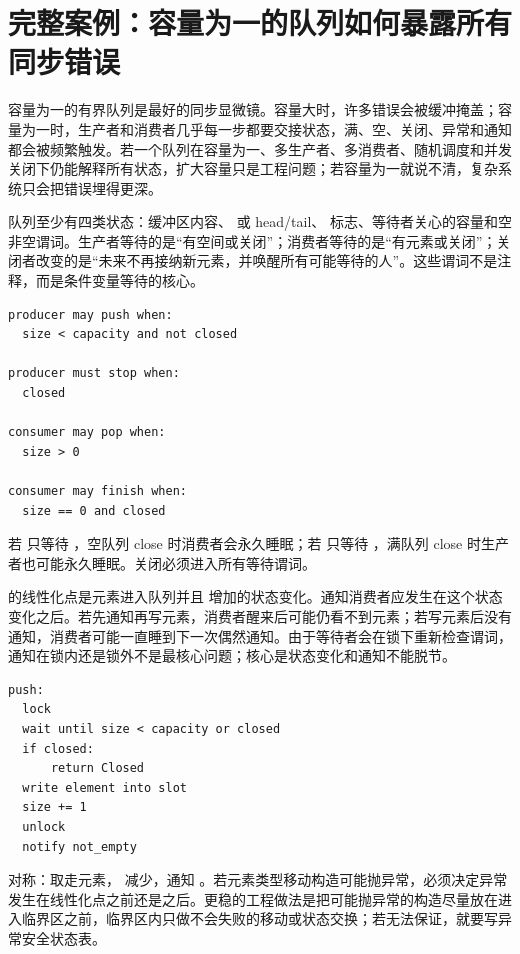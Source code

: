\section{完整案例：容量为一的队列如何暴露所有同步错误}

容量为一的有界队列是最好的同步显微镜。容量大时，许多错误会被缓冲掩盖；容量为一时，生产者和消费者几乎每一步都要交接状态，满、空、关闭、异常和通知都会被频繁触发。若一个队列在容量为一、多生产者、多消费者、随机调度和并发关闭下仍能解释所有状态，扩大容量只是工程问题；若容量为一就说不清，复杂系统只会把错误埋得更深。

队列至少有四类状态：缓冲区内容、 或 head/tail、 标志、等待者关心的容量和空非空谓词。生产者等待的是“有空间或关闭”；消费者等待的是“有元素或关闭”；关闭者改变的是“未来不再接纳新元素，并唤醒所有可能等待的人”。这些谓词不是注释，而是条件变量等待的核心。

\begin{lstlisting}[numbers=none,caption={容量为一队列的谓词}]
producer may push when:
  size < capacity and not closed

producer must stop when:
  closed

consumer may pop when:
  size > 0

consumer may finish when:
  size == 0 and closed
\end{lstlisting}

若  只等待 ，空队列 close 时消费者会永久睡眠；若  只等待 ，满队列 close 时生产者也可能永久睡眠。关闭必须进入所有等待谓词。

 的线性化点是元素进入队列并且  增加的状态变化。通知消费者应发生在这个状态变化之后。若先通知再写元素，消费者醒来后可能仍看不到元素；若写元素后没有通知，消费者可能一直睡到下一次偶然通知。由于等待者会在锁下重新检查谓词，通知在锁内还是锁外不是最核心问题；核心是状态变化和通知不能脱节。

\begin{lstlisting}[numbers=none,caption={push 的状态和通知顺序}]
push:
  lock
  wait until size < capacity or closed
  if closed:
      return Closed
  write element into slot
  size += 1
  unlock
  notify not_empty
\end{lstlisting}

 对称：取走元素， 减少，通知 。若元素类型移动构造可能抛异常，必须决定异常发生在线性化点之前还是之后。更稳的工程做法是把可能抛异常的构造尽量放在进入临界区之前，临界区内只做不会失败的移动或状态交换；若无法保证，就要写异常安全状态表。


